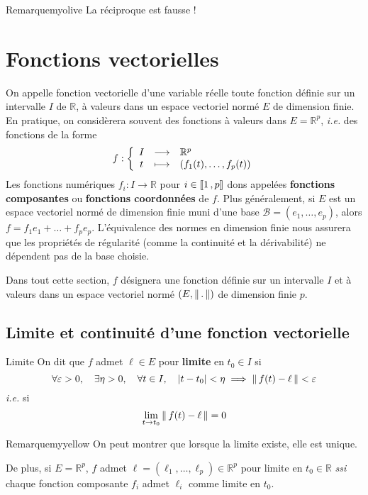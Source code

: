     \begin{omed}{Remarque}{myolive}        
        La réciproque est fausse !
    \end{omed}

\newpage

\section{Fonctions vectorielles}

    On appelle fonction vectorielle d’une variable réelle toute fonction définie sur un intervalle $I$ de $\mathbb{R}$, à valeurs dans un espace vectoriel normé $E$ de dimension finie. En pratique, on considèrera souvent des fonctions à valeurs dans $E = \mathbb{R}^p$, \textit{i.e.} des fonctions de la forme 
    \[ \fonction{f}{I}{\mathbb{R}^p}{t}{\left( f_1(t),\ldots,f_p(t) \right)} \]
    Les fonctions numériques $f_i : I \to \mathbb{R}$ pour $i \in \left\llbracket 1 \, , p \right\rrbracket$ dons appelées \textbf{fonctions composantes} ou \textbf{fonctions coordonnées} de $f$. Plus généralement, si $E$ est un espace vectoriel normé de dimension finie muni d’une base $\mathcal{B} = (e_1,\ldots,e_p)$, alors $f = f_1e_1 + \ldots + f_p e_p$. L’équivalence des normes en dimension finie nous assurera que les propriétés de régularité (comme la continuité et la dérivabilité) ne dépendent pas de la base choisie.

    Dans tout cette section, $f$ désignera une fonction définie sur un intervalle $I$ et à valeurs dans un espace vectoriel normé $\left(E, \left\lVert\,.\,\right\rVert\right)$ de dimension finie $p$.

\subsection{Limite et continuité d’une fonction vectorielle}

    \begin{defi}{Limite}{}
        On dit que $f$ admet $\ell \in E$ pour \textbf{limite} en $t_0 \in I$ si 
        \[ \forall \varepsilon > 0, \quad \exists \eta > 0, \quad \forall t \in I, \quad \left\lvert t - t_0\right\rvert < \eta \implies \left\lVert\,f(t) - \ell\,\right\rVert < \varepsilon \]
        \textit{i.e.} si 
        \[ \lim_{t \to t_0} \left\lVert\,f(t) - \ell\,\right\rVert = 0 \]
    \end{defi}

    \begin{omed}{Remarque}{myyellow}
        On peut montrer que lorsque la limite existe, elle est unique. 
        
        De plus, si $E = \mathbb{R}^p$, $f$ admet $\ell = (\ell_1,\ldots,\ell_p) \in \mathbb{R}^p$ pour limite en $t_0 \in \mathbb{R}$ \textit{ssi} chaque fonction composante $f_i$ admet $\ell_i$ comme limite en $t_0$.
    \end{omed}

